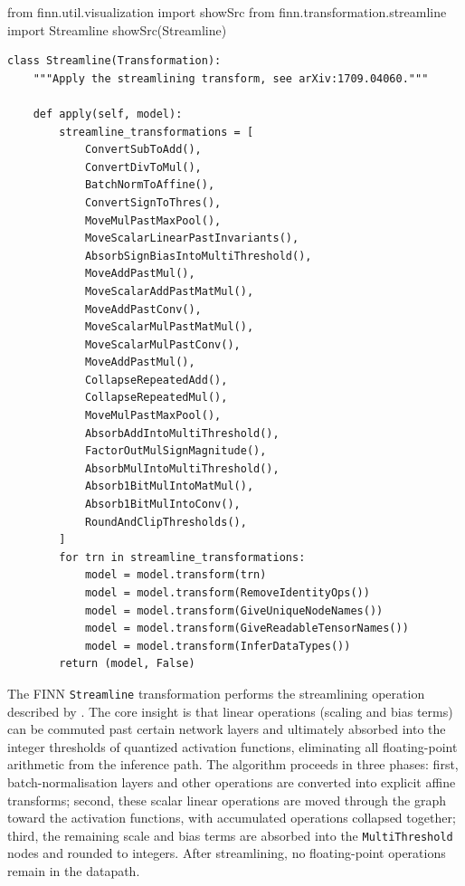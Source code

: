 \documentclass[11pt]{article}
\begin{document}
\begin{jupytercell}
from finn.util.visualization import showSrc
from finn.transformation.streamline import Streamline
showSrc(Streamline)
\end{jupytercell}
\begin{verbatim}
class Streamline(Transformation):
    """Apply the streamlining transform, see arXiv:1709.04060."""

    def apply(self, model):
        streamline_transformations = [
            ConvertSubToAdd(),
            ConvertDivToMul(),
            BatchNormToAffine(),
            ConvertSignToThres(),
            MoveMulPastMaxPool(),
            MoveScalarLinearPastInvariants(),
            AbsorbSignBiasIntoMultiThreshold(),
            MoveAddPastMul(),
            MoveScalarAddPastMatMul(),
            MoveAddPastConv(),
            MoveScalarMulPastMatMul(),
            MoveScalarMulPastConv(),
            MoveAddPastMul(),
            CollapseRepeatedAdd(),
            CollapseRepeatedMul(),
            MoveMulPastMaxPool(),
            AbsorbAddIntoMultiThreshold(),
            FactorOutMulSignMagnitude(),
            AbsorbMulIntoMultiThreshold(),
            Absorb1BitMulIntoMatMul(),
            Absorb1BitMulIntoConv(),
            RoundAndClipThresholds(),
        ]
        for trn in streamline_transformations:
            model = model.transform(trn)
            model = model.transform(RemoveIdentityOps())
            model = model.transform(GiveUniqueNodeNames())
            model = model.transform(GiveReadableTensorNames())
            model = model.transform(InferDataTypes())
        return (model, False)
\end{verbatim}
The FINN \verb+Streamline+ transformation performs the streamlining operation described by \cite{umurogluStreamlinedDeploymentQuantized2018}.
The core insight is that linear operations (scaling and bias terms) can be commuted past certain network layers and ultimately absorbed into the integer thresholds of quantized activation functions, eliminating all floating-point arithmetic from the inference path.
The algorithm proceeds in three phases: first, batch-normalisation layers and other operations are converted into explicit affine transforms; second, these scalar linear operations are moved through the graph toward the activation functions, with accumulated operations collapsed together; third, the remaining scale and bias terms are absorbed into the \verb+MultiThreshold+ nodes and rounded to integers.
After streamlining, no floating-point operations remain in the datapath.
\end{document}
